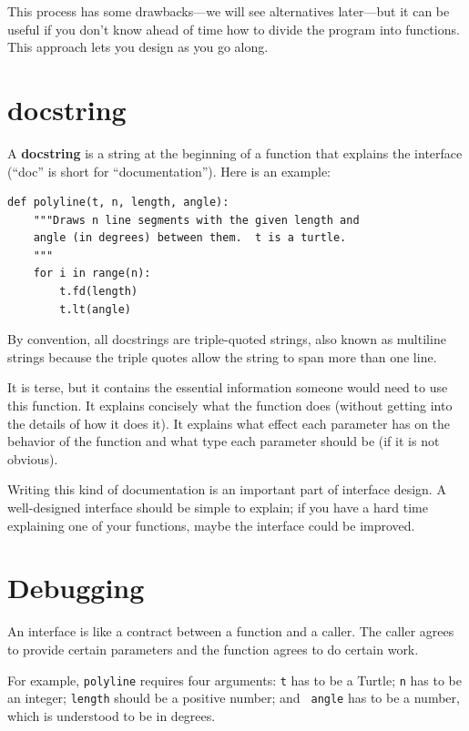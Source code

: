 \documentclass[10pt]{book}
\begin{document}
This process has some drawbacks---we will see alternatives later---but
it can be useful if you don't know ahead of time how to divide the
program into functions.  This approach lets you design as you go
along.


\section{docstring}
\label{docstring}

A {\bf docstring} is a string at the beginning of a function that
explains the interface (``doc'' is short for ``documentation'').  Here
is an example:

\begin{verbatim}
def polyline(t, n, length, angle):
    """Draws n line segments with the given length and
    angle (in degrees) between them.  t is a turtle.
    """
    for i in range(n):
        t.fd(length)
        t.lt(angle)
\end{verbatim}
%
By convention, all docstrings are triple-quoted strings, also known
as multiline strings because the triple quotes allow the string
to span more than one line.

It is terse, but it contains the essential information
someone would need to use this function.  It explains concisely what
the function does (without getting into the details of how it does
it).  It explains what effect each parameter has on the behavior of
the function and what type each parameter should be (if it is not
obvious).

Writing this kind of documentation is an important part of interface
design.  A well-designed interface should be simple to explain;
if you have a hard time explaining one of your functions,
maybe the interface could be improved.


\section{Debugging}

An interface is like a contract between a function and a caller.
The caller agrees to provide certain parameters and the function
agrees to do certain work.

For example, {\tt polyline} requires four arguments: {\tt t} has to be
a Turtle; {\tt n} has to be an
integer; {\tt length} should be a positive number; and {\tt
  angle} has to be a number, which is understood to be in degrees.
\end{document}

